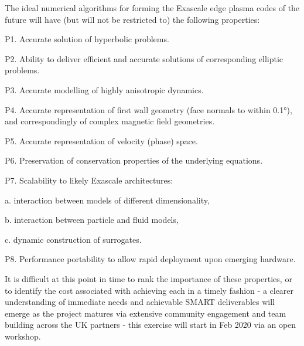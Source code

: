 \documentclass{article}
\begin{document}
\vspace{24pt}
The ideal numerical algorithms for forming the Exascale edge plasma codes of the 
future will have (but will not be restricted to) the following properties:

\vspace{24pt}
\leftskip=0pt
P1. Accurate solution of hyperbolic problems.

\vspace{12pt}
P2. Ability to deliver efficient and accurate solutions of corresponding elliptic 
problems.

\vspace{12pt}
P3. Accurate modelling of highly anisotropic dynamics. 

\vspace{12pt}
P4. Accurate representation of first wall geometry (face normals to within 0.1°), 
and correspondingly of complex magnetic field geometries.

\vspace{12pt}
P5. Accurate representation of velocity (phase) space.

\vspace{12pt}
P6. Preservation of conservation properties of the underlying equations.

\vspace{12pt}
P7. Scalability to likely Exascale architectures:

\vspace{12pt}
a. interaction between models of different dimensionality,

\vspace{12pt}
b. interaction between particle and fluid models,

\vspace{12pt}
c. dynamic construction of surrogates.

\vspace{12pt}
P8. Performance portability to allow rapid deployment upon emerging hardware.

\vspace{24pt}
\leftskip=-14pt
It is difficult at this point in time to rank the importance of these properties, 
or to identify the cost associated with achieving each in a timely fashion - a 
clearer understanding of immediate needs and achievable SMART deliverables will 
emerge as the project matures via extensive community engagement and team building 
across the UK partners - this exercise will start in Feb 2020 via an open workshop. 
\end{document}
